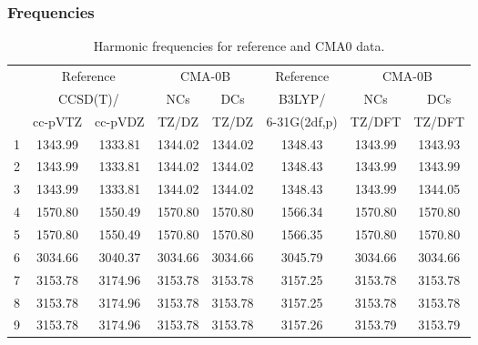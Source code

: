 \documentclass[10pt,oneside]{article}
\begin{document}
\subsubsection*{Frequencies}
\begin{table}[h!]
\centering
\caption{Harmonic frequencies for reference and CMA0 data.}
\begin{tabular}{cccccccc}
\toprule
{} & \multicolumn{2}{c}{Reference} & \multicolumn{2}{c}{CMA-0B} &    Reference & \multicolumn{2}{c}{CMA-0B} \\
{} & \multicolumn{2}{c}{CCSD(T)/} &     NCs &     DCs &       B3LYP/ &     NCs &     DCs \\
{} &   cc-pVTZ & cc-pVDZ &   TZ/DZ &   TZ/DZ & 6-31G(2df,p) &  TZ/DFT &  TZ/DFT \\
\midrule
1 &   1343.99 & 1333.81 & 1344.02 & 1344.02 &      1348.43 & 1343.99 & 1343.93 \\
2 &   1343.99 & 1333.81 & 1344.02 & 1344.02 &      1348.43 & 1343.99 & 1343.99 \\
3 &   1343.99 & 1333.81 & 1344.02 & 1344.02 &      1348.43 & 1343.99 & 1344.05 \\
4 &   1570.80 & 1550.49 & 1570.80 & 1570.80 &      1566.34 & 1570.80 & 1570.80 \\
5 &   1570.80 & 1550.49 & 1570.80 & 1570.80 &      1566.35 & 1570.80 & 1570.80 \\
6 &   3034.66 & 3040.37 & 3034.66 & 3034.66 &      3045.79 & 3034.66 & 3034.66 \\
7 &   3153.78 & 3174.96 & 3153.78 & 3153.78 &      3157.25 & 3153.78 & 3153.78 \\
8 &   3153.78 & 3174.96 & 3153.78 & 3153.78 &      3157.25 & 3153.78 & 3153.78 \\
9 &   3153.78 & 3174.96 & 3153.78 & 3153.78 &      3157.26 & 3153.79 & 3153.79 \\
\bottomrule
\end{tabular}
\end{table}

\clearpage
\end{document}
